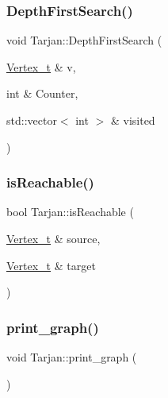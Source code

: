\subsubsection{\texorpdfstring{Depth\+First\+Search()}{DepthFirstSearch()}}
{\footnotesize\ttfamily void Tarjan\+::\+Depth\+First\+Search (\begin{DoxyParamCaption}\item[{\hyperlink{class_graph_component_ae67114a6ce5a001dc35e1996e1b45aa0_ae67114a6ce5a001dc35e1996e1b45aa0}{Vertex\+\_\+t} \&}]{v,  }\item[{int \&}]{Counter,  }\item[{std\+::vector$<$ int $>$ \&}]{visited }\end{DoxyParamCaption})}

\mbox{\label{class_tarjan_a74f69dfaa1d4cf3bac06aef7a704c0b8_a74f69dfaa1d4cf3bac06aef7a704c0b8}} 
\subsubsection{\texorpdfstring{is\+Reachable()}{isReachable()}}
{\footnotesize\ttfamily bool Tarjan\+::is\+Reachable (\begin{DoxyParamCaption}\item[{\hyperlink{class_graph_component_ae67114a6ce5a001dc35e1996e1b45aa0_ae67114a6ce5a001dc35e1996e1b45aa0}{Vertex\+\_\+t} \&}]{source,  }\item[{\hyperlink{class_graph_component_ae67114a6ce5a001dc35e1996e1b45aa0_ae67114a6ce5a001dc35e1996e1b45aa0}{Vertex\+\_\+t} \&}]{target }\end{DoxyParamCaption})}

\mbox{\label{class_tarjan_a0ef20e22407703c87c880898c8ad5745_a0ef20e22407703c87c880898c8ad5745}} 
\subsubsection{\texorpdfstring{print\+\_\+graph()}{print\_graph()}}
{\footnotesize\ttfamily void Tarjan\+::print\+\_\+graph (\begin{DoxyParamCaption}{ }\end{DoxyParamCaption})}

